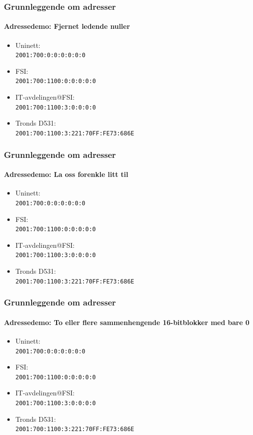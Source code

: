 \begin{frame}%
  \frametitle{Grunnleggende om adresser}
  \framesubtitle{Adressedemo: Fjernet ledende nuller}
  \begin{itemize}%
  \item Uninett:\\\texttt{2001:\alert{700}:\alert{0}:\alert{0}:\alert{0}:\alert{0}:\alert{0}:\alert{0}\phantom{/32}}
  \item FSI:\\\texttt{2001:\alert{700}:1100:\alert{0}:\alert{0}:\alert{0}:\alert{0}:\alert{0}\phantom{/48}}
  \item IT-avdelingen@FSI:\\\texttt{2001:\alert{700}:1100:\alert{3}:\alert{0}:\alert{0}:\alert{0}:\alert{0}\phantom{/64}}
  \item Tronds D531:\\\texttt{2001:\alert{700}:1100:\alert{3}:\alert{221}:70FF:FE73:686E\phantom{/128}}
  \end{itemize}
\end{frame}

\begin{frame}%
  \frametitle{Grunnleggende om adresser}
  \framesubtitle{Adressedemo: La oss forenkle litt til}
  \begin{itemize}%
  \item Uninett:\\\texttt{2001:700:0:0:0:0:0:0\phantom{/32}}
  \item FSI:\\\texttt{2001:700:1100:0:0:0:0:0\phantom{/48}}
  \item IT-avdelingen@FSI:\\\texttt{2001:700:1100:3:0:0:0:0\phantom{/64}}
  \item Tronds D531:\\\texttt{2001:700:1100:3:221:70FF:FE73:686E\phantom{/128}}
  \end{itemize}
\end{frame}

\begin{frame}%
  \frametitle{Grunnleggende om adresser}
  \framesubtitle{Adressedemo: To eller flere sammenhengende 16-bitblokker med bare 0}
  \begin{itemize}%
  \item Uninett:\\\texttt{2001:700:\alert{0:0:0:0:0:0}\phantom{/32}}
  \item FSI:\\\texttt{2001:700:1100:\alert{0:0:0:0:0}\phantom{/48}}
  \item IT-avdelingen@FSI:\\\texttt{2001:700:1100:3:\alert{0:0:0:0}\phantom{/64}}
  \item Tronds D531:\\\texttt{2001:700:1100:3:221:70FF:FE73:686E\phantom{/128}}
  \end{itemize}
\end{frame}

